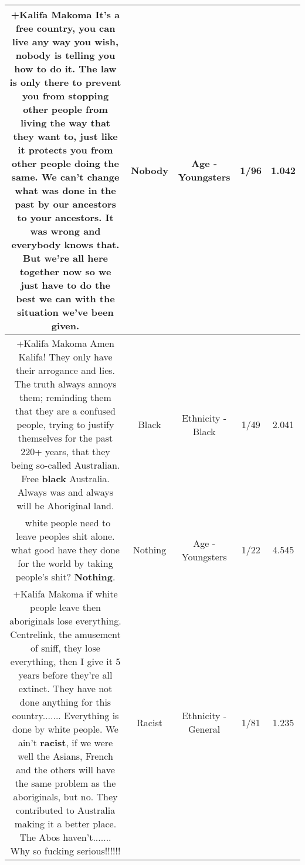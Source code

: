 \documentclass[11pt]{article}
\newlength\mylength
\begin{document}
\begin{center}
\begin{longtable}{|C{.65\mylength}|C{.30\mylength}|C{.12\mylength}|C{.12\mylength}|C{.12\mylength}|}
  \small +Kalifa Makoma It's a free country, you can live any way you wish, \textbf{nobody} is telling you how to do it. The law is only there to prevent you from stopping other people from living the way that they want to, just like it protects you from other people doing the same. We can't change what was done in the past by our ancestors to your ancestors. It was wrong and everybody knows that. But we're all here together now so we just have to do the best we can with the situation we've been given.\normalsize   & Nobody & Age - Youngsters & 1/96 & 1.042 \\  \hline
  \small +Kalifa Makoma Amen Kalifa! They only have their arrogance and lies. The truth always annoys them; reminding them that they are a confused people, trying to justify themselves for the past 220+ years, that they being so-called Australian. Free \textbf{black} Australia. Always was and always will be Aboriginal land.\normalsize   & Black & Ethnicity - Black & 1/49 & 2.041 \\  \hline
  \small {} white people need to leave peoples shit alone. what good have they done for the world by taking people's shit? \textbf{Nothing}.\normalsize   & Nothing & Age - Youngsters & 1/22 & 4.545 \\  \hline
  \small +Kalifa Makoma if white people leave then aboriginals lose everything. Centrelink, the amusement of sniff, they lose everything, then I give it 5 years before they're all extinct. They have not done anything for this country....... Everything is done by white people. We ain't \textbf{racist}, if we were well the Asians, French and the others will have the same problem as the aboriginals, but no. They contributed to Australia making it a better place. The Abos haven't....... Why so fucking serious!!!!!!\normalsize   & Racist & Ethnicity - General & 1/81 & 1.235 \\  \hline

\end{longtable}
\end{center}
\end{document}
